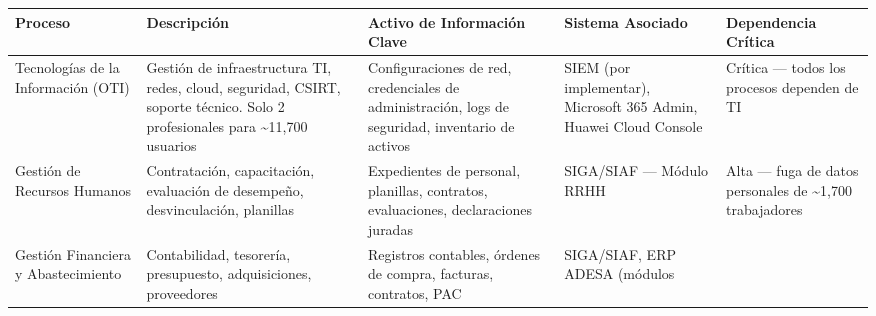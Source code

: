\documentclass[10pt,letterpaper]{article}
\begin{document}
{\setlength{\RaggedRightRightskip}{0pt plus 5em}\small\sloppy \begin{longtable}[]{@{}
  >{\hspace{0pt}\RaggedRight\arraybackslash}p{}
  >{\hspace{0pt}\RaggedRight\arraybackslash}p{}
  >{\hspace{0pt}\RaggedRight\arraybackslash}p{}
  >{\hspace{0pt}\RaggedRight\arraybackslash}p{}
  >{\hspace{0pt}\RaggedRight\arraybackslash}p{}@{}}
\toprule\noalign{}
\begin{minipage}[b]{\linewidth}\raggedright
Proceso
\end{minipage} & \begin{minipage}[b]{\linewidth}\raggedright
Descripción
\end{minipage} & \begin{minipage}[b]{\linewidth}\raggedright
Activo de Información Clave
\end{minipage} & \begin{minipage}[b]{\linewidth}\raggedright
Sistema Asociado
\end{minipage} & \begin{minipage}[b]{\linewidth}\raggedright
Dependencia Crítica
\end{minipage} \\
\midrule\noalign{}
\endhead
\bottomrule\noalign{}
\endlastfoot
Tecnologías de la Información (OTI) & Gestión de infraestructura TI,
redes, cloud, seguridad, CSIRT, soporte técnico. Solo 2 profesionales
para \textasciitilde11,700 usuarios & Configuraciones de red,
credenciales de administración, logs de seguridad, inventario de activos
& SIEM (por implementar), Microsoft 365 Admin, Huawei Cloud Console &
Crítica --- todos los procesos dependen de TI \\
Gestión de Recursos Humanos & Contratación, capacitación, evaluación de
desempeño, desvinculación, planillas & Expedientes de personal,
planillas, contratos, evaluaciones, declaraciones juradas & SIGA/SIAF
--- Módulo RRHH & Alta --- fuga de datos personales de
\textasciitilde1,700 trabajadores \\
Gestión Financiera y Abastecimiento & Contabilidad, tesorería,
presupuesto, adquisiciones, proveedores & Registros contables, órdenes
de compra, facturas, contratos, PAC & SIGA/SIAF, ERP ADESA (módulos

\end{longtable}}
\end{document}
